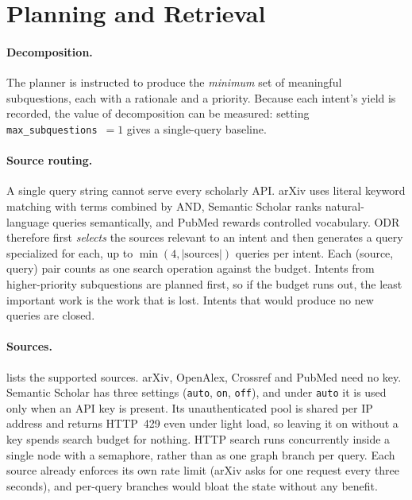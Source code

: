 \documentclass{article}
\newcommand{\code}[1]{\texttt{#1}}
\newcommand{\sys}{ODR}
\begin{document}
\section{Planning and Retrieval}
\label{sec:retrieval}

\paragraph{Decomposition.}
The planner is instructed to produce the \emph{minimum} set of meaningful
subquestions, each with a rationale and a priority. Because each intent's
yield is recorded, the value of decomposition can be measured: setting
\code{max\_subquestions}~$=1$ gives a single-query baseline.

\paragraph{Source routing.}
A single query string cannot serve every scholarly API. arXiv uses literal
keyword matching with terms combined by AND, Semantic Scholar ranks
natural-language queries semantically, and PubMed rewards controlled
vocabulary. \sys{} therefore first \emph{selects} the sources relevant to
an intent and then generates a query specialized for each, up to
$\min(4, |\text{sources}|)$ queries per intent. Each (source, query) pair
counts as one search operation against the budget. Intents from
higher-priority subquestions are planned first, so if the budget runs out,
the least important work is the work that is lost. Intents that would
produce no new queries are closed.

\paragraph{Sources.}
 lists the supported sources. arXiv, OpenAlex, Crossref
and PubMed need no key. Semantic Scholar has three settings (\code{auto},
\code{on}, \code{off}), and under \code{auto} it is used only when an API
key is present. Its unauthenticated pool is shared per IP address and
returns HTTP~429 even under light load, so leaving it on without a key
spends search budget for nothing. HTTP search runs concurrently inside a
single node with a semaphore, rather than as one graph branch per query.
Each source already enforces its own rate limit (arXiv asks for one request
every three seconds), and per-query branches would bloat the state without
any benefit.
\end{document}
